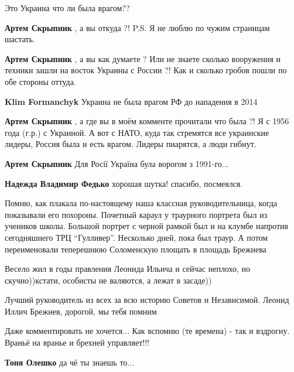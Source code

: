 \begin{itemize}
\begin{itemize}
\begin{itemize}
\end{itemize} %

Это Украина что ли была врагом??

\begin{itemize} %
\textbf{Артем Скрыпник} , а вы откуда ?! P.S. Я не люблю по чужим страницам шастать.

\textbf{Артем Скрыпник} , а вы как думаете ? Или не знаете сколько вооружения и техники зашли на восток Украины с России ?! Как и сколько гробов пошли по обе стороны оттуда.

\textbf{Klim Formanchyk} Украина не была врагом РФ до нападения в 2014

\textbf{Артем Скрыпник} , а где вы в моём комменте прочитали что была ?! Я с 1956 года (г.р.) с Украиной. А вот с НАТО, куда так стремятся все украинские лидеры, Россия была и есть врагом. Лидеры пиарятся, а люди гибнут.

\textbf{Артем Скрыпник} Для Росії Україна була ворогом з 1991-го...

\textbf{Надежда Владимир Федько} хорошая шутка! спасибо, посмеялся.
\end{itemize} %

\end{itemize} %


Помню, как плакала по-настоящему наша классная руководительница, когда
показывали его похороны. Почетный караул у траурного портрета был из учеников
школы. Большой портрет с черной рамкой был и на клумбе напротив сегодняшнего
ТРЦ \enquote{Гулливер}. Несколько дней, пока был траур. А потом переименовали
теперешнюю Соломенскую площать в площадь Брежнева


Весело жил в годы правления Леонида Ильича и сейчас неплохо, но скучно))кстати,
особисты не валяются, а лежат в засаде))


Лучший руководитель из всех за всю историю Советов и Независимой. Леонид Иллич
Брежнев, дорогой, мы тебя помним

Даже комментировать не хочется... Как вспомню (те времена) - так и вздрогну. Враньё на вранье и брехней управляет!!!

\begin{itemize} %
\textbf{Тоня Олешко} да чё ты знаешь то...


\end{itemize}
\end{itemize}
